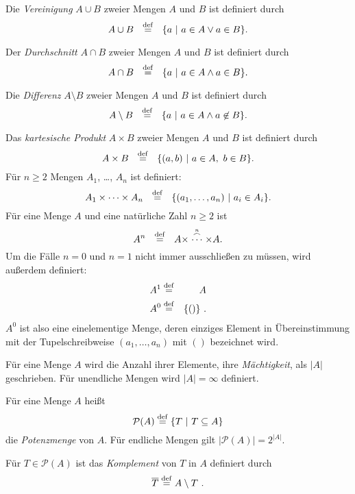Die \emph{Vereinigung} $A \cup B$ 
zweier Mengen $A$ und $B$ ist definiert durch
\[A \cup B\ \ \deq\ \ \{a\ |\ a \in A \vee a \in B\}.\]

Der \emph{Durchschnitt} $A \cap B$ 
zweier Mengen $A$ und $B$ ist definiert durch
\[A \cap B\ \ \deq\ \ \{a\ |\ a \in A \wedge a \in B\}.\]

Die \emph{Differenz} $A \setminus B$ 
zweier Mengen $A$ und $B$ ist definiert durch
\[A \setminus B\ \ \deq\ \ \{a\ |\ a \in A \wedge a \not \in B\}.\]

\begin{definition}
\label{cart}
   Das \emph{kartesische Produkt} 
     $A \times B$ zweier Mengen 
   $A$ und $B$ ist definiert durch
   \[ A \times B\ \ \deq \ \ \{(a,b)\ |\ a \in A,\ b \in B\}.\]
   Für $n \geq 2$ Mengen
   $A_1$, \ldots, $A_n$ ist definiert:
   \[A_1 \times \cdots \times A_n\ \ 
        \deq \ \ \{(a_1,\ldots,a_n)\ |\ a_i \in A_i\}.\]
   Für eine Menge $A$ und eine natürliche Zahl $n \geq 2$ ist
   \[A^n \ \ \stackrel{\rm def}{=}  \ \ A \times 
           \stackrel{\stackrel{n}{\frown}}{\cdots} \times A.\]
   Um die Fälle $n=0$ und $n=1$
   nicht immer ausschließen zu müssen,
   wird außerdem definiert:
   \begin{eqnarray*}
   A^1 & \stackrel{\rm def}{=} & A\\
   A^0 & \stackrel{\rm def}{=} & \{()\} \ .
   \end{eqnarray*}
   $A^0$ ist also eine einelementige Menge, deren einziges Element in
   Über\-ein\-stim\-mung mit der Tupelschreibweise $(a_1,\ldots,a_n)$ mit $()$
   bezeichnet wird.\index{*@$()$}
\end{definition}

Für eine Menge $A$ wird die Anzahl ihrer Elemente, 
ihre \textit{Mäch\-tig\-keit}, 
als $|A|$ geschrieben. Für unendliche Mengen wird
$|A| = \infty$ definiert.

Für eine Menge $A$ heißt 
\[ \mathcal{P}(A) \stackrel{\rm def}{=} \{ T\ |\ T \subseteq A\}\]
die \emph{Potenzmenge} 
von $A$. Für endliche Mengen gilt $|\mathcal{P}(A)| = 2^{|A|}$.

\begin{definition}
    Für $T \in \mathcal{P}(A)$ ist das \emph{Komplement} von $T$ in $A$
    definiert durch\index{Komplement}\index{*@$\setminus$}
    \[ \overline{T} \stackrel{\rm def}{=} A \setminus T\ .\]
\end{definition}

